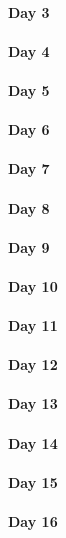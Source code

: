 \documentclass[UTF8,a4paper,8pt]{ctexart}
\begin{document}
 	 \paragraph{Day 3       \quad     }
 	 \paragraph{Day 4       \quad     }
 	 \paragraph{Day 5       \quad     }
 	 \paragraph{Day 6       \quad     }
 	 \paragraph{Day 7       \quad     }
 	 \paragraph{Day 8       \quad     }
 	 \paragraph{Day 9       \quad     }
 	 \paragraph{Day 10      \quad     }
 	 \paragraph{Day 11      \quad     }
 	 \paragraph{Day 12      \quad     }
 	 \paragraph{Day 13      \quad     }
 	 \paragraph{Day 14      \quad     }
 	 \paragraph{Day 15      \quad     }
 	 \paragraph{Day 16      \quad     }
\end{document}
